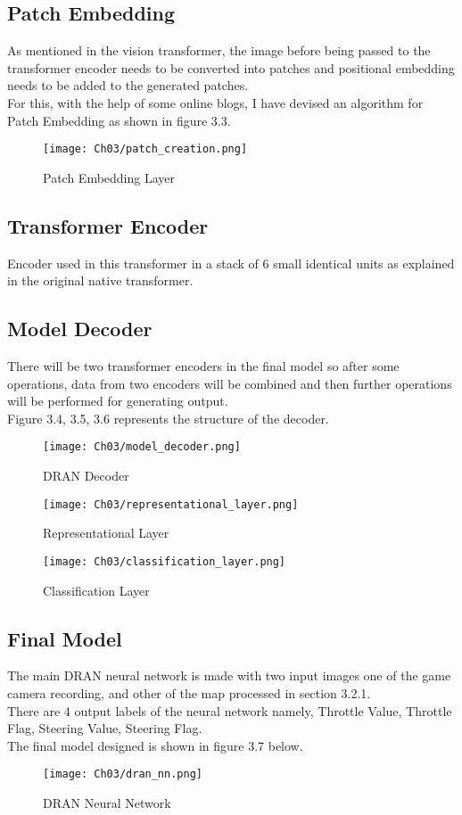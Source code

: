 \subsection{Patch Embedding}
As mentioned in the vision transformer, the image before being passed to the transformer encoder needs to be converted into patches and positional embedding needs to be added to the generated patches.
\\
For this, with the help of some online blogs, I have devised an algorithm for Patch Embedding as shown in figure 3.3.
\begin{figure}[h]
    \centering
    \texttt{[image: Ch03/patch\_creation.png]}
    \caption{Patch Embedding Layer}
    \label{figure:6}
\end{figure}
\FloatBarrier

\subsection{Transformer Encoder}
Encoder used in this transformer in a stack of 6 small identical units as explained in the original native transformer.

\subsection{Model Decoder}
There will be two transformer encoders in the final model so after some operations, data from two encoders will be combined and then further operations will be performed for generating output.
\\
Figure 3.4, 3.5, 3.6 represents the structure of the decoder.
\begin{figure}[h]
    \centering
    \texttt{[image: Ch03/model\_decoder.png]}
    \caption{DRAN Decoder}
    \label{figure:7}
\end{figure}
\begin{figure}[h]
    \centering
    \texttt{[image: Ch03/representational\_layer.png]}
    \caption{Representational Layer}
    \label{figure:8}
\end{figure}
\begin{figure}[h]
    \centering
    \texttt{[image: Ch03/classification\_layer.png]}
    \caption{Classification Layer}
    \label{figure:9}
\end{figure}
\FloatBarrier

\subsection{Final Model}
The main DRAN neural network is made with two input images one of the game camera recording, and other of the map processed in section 3.2.1.
\\
There are 4 output labels of the neural network namely, Throttle Value, Throttle Flag, Steering Value, Steering Flag.
\\
The final model designed is shown in figure 3.7 below.
\begin{figure}[h]
    \centering
    \texttt{[image: Ch03/dran\_nn.png]}
    \caption{DRAN Neural Network}
    \label{figure:10}
\end{figure}

